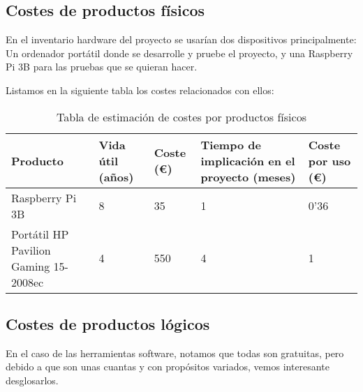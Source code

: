 \subsection {Costes de productos físicos}
En el inventario hardware del proyecto se usarían dos dispositivos principalmente: Un ordenador portátil donde se desarrolle y pruebe el proyecto, y una Raspberry Pi 3B para las pruebas que se quieran hacer.

Listamos en la siguiente tabla los costes relacionados con ellos:

\begin{center}
	\begin{table}[H]
		\centering
		\begin{tabularx}{\textwidth}{|X|X|X|X|X|}
			\hline
			\cellcolor{lightblue}\textbf{Producto} & 
			\cellcolor{lightblue}\textbf{Vida útil (años)} &  \cellcolor{lightblue}\textbf{Coste (€)} &
			\cellcolor{lightblue}\textbf{Tiempo de implicación en el proyecto (meses)} &
			\cellcolor{lightblue}\textbf{Coste por uso (€)} \\
			\hline
			Raspberry Pi 3B & 8 & 35 & 1 & 0'36\\
			\hline
			Portátil HP Pavilion Gaming 15-2008ec & 4 & 550 & 4 & 1\\
			\hline
		\end{tabularx}
		\caption{Tabla de estimación de costes por productos físicos}
	\end{table}
\end{center}

\subsection{Costes de productos lógicos}
En el caso de las herramientas software, notamos que todas son gratuitas, pero debido a que son unas cuantas y con propósitos variados, vemos interesante desglosarlos.

